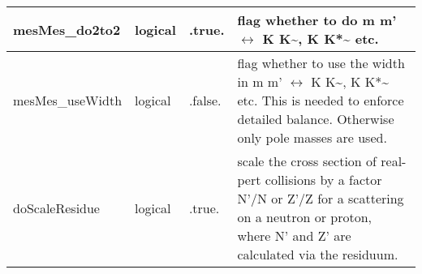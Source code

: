 \documentclass{article}
\begin{document}
\begin{longtable}{llll}
\midrule
mesMes\_do2to2 & \begin{minipage}[t]{2cm}logical\end{minipage} & \begin{minipage}[t]{2cm}.true.\end{minipage} & \begin{minipage}[t]{12cm}flag whether to do m m' $\leftrightarrow$ K K\~{}, K K*\~{} etc.\end{minipage}\\*
\midrule
mesMes\_useWidth & \begin{minipage}[t]{2cm}logical\end{minipage} & \begin{minipage}[t]{2cm}.false.\end{minipage} & \begin{minipage}[t]{12cm}flag whether to use the width in m m' $\leftrightarrow$ K K\~{}, K K*\~{} etc. This is needed to enforce detailed balance. Otherwise only pole masses are used.\end{minipage}\\*
\midrule
doScaleResidue & \begin{minipage}[t]{2cm}logical\end{minipage} & \begin{minipage}[t]{2cm}.true.\end{minipage} & \begin{minipage}[t]{12cm}scale the cross section of real-pert collisions by a factor N'/N or Z'/Z for a scattering on a neutron or proton, where N' and Z' are calculated via the residuum.\end{minipage}\\*
\bottomrule
\end{longtable}
{ }



\end{document}
